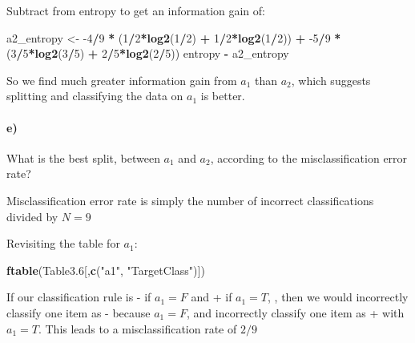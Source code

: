 \documentclass[]{article}
\newenvironment{Shaded}{\begin{snugshade}}{\end{snugshade}}
\newcommand{\DecValTok}[1]{\textcolor[rgb]{0.00,0.00,0.81}{#1}}
\newcommand{\FloatTok}[1]{\textcolor[rgb]{0.00,0.00,0.81}{#1}}
\newcommand{\KeywordTok}[1]{\textcolor[rgb]{0.13,0.29,0.53}{\textbf{#1}}}
\newcommand{\NormalTok}[1]{#1}
\newcommand{\OperatorTok}[1]{\textcolor[rgb]{0.81,0.36,0.00}{\textbf{#1}}}
\newcommand{\StringTok}[1]{\textcolor[rgb]{0.31,0.60,0.02}{#1}}
\let\oldparagraph\paragraph
\renewcommand{\paragraph}[1]{\oldparagraph{#1}\mbox{}}
\begin{document}
Subtract from entropy to get an information gain of:

\begin{Shaded}
\begin{Highlighting}[]
\NormalTok{a2_entropy <-}\StringTok{ }\DecValTok{-4}\OperatorTok{/}\DecValTok{9} \OperatorTok{*}\StringTok{ }\NormalTok{(}\DecValTok{1}\OperatorTok{/}\DecValTok{2}\OperatorTok{*}\KeywordTok{log2}\NormalTok{(}\DecValTok{1}\OperatorTok{/}\DecValTok{2}\NormalTok{) }\OperatorTok{+}\StringTok{ }\DecValTok{1}\OperatorTok{/}\DecValTok{2}\OperatorTok{*}\KeywordTok{log2}\NormalTok{(}\DecValTok{1}\OperatorTok{/}\DecValTok{2}\NormalTok{)) }\OperatorTok{+}\StringTok{ }\DecValTok{-5}\OperatorTok{/}\DecValTok{9} \OperatorTok{*}\StringTok{ }\NormalTok{(}\DecValTok{3}\OperatorTok{/}\DecValTok{5}\OperatorTok{*}\KeywordTok{log2}\NormalTok{(}\DecValTok{3}\OperatorTok{/}\DecValTok{5}\NormalTok{) }\OperatorTok{+}\StringTok{ }\DecValTok{2}\OperatorTok{/}\DecValTok{5}\OperatorTok{*}\KeywordTok{log2}\NormalTok{(}\DecValTok{2}\OperatorTok{/}\DecValTok{5}\NormalTok{))}
\NormalTok{entropy }\OperatorTok{-}\StringTok{ }\NormalTok{a2_entropy}
\end{Highlighting}
\end{Shaded}

So we find much greater information gain from \(a_1\) than \(a_2\),
which suggests splitting and classifying the data on \(a_1\) is better.

\hypertarget{e}{%
\paragraph{e)}\label{e}}

What is the best split, between \(a_1\) and \(a_2\), according to the
misclassification error rate?

Misclassification error rate is simply the number of incorrect
classifications divided by \(N = 9\)

Revisiting the table for \(a_1\):

\begin{Shaded}
\begin{Highlighting}[]
\KeywordTok{ftable}\NormalTok{(Table3}\FloatTok{.6}\NormalTok{[,}\KeywordTok{c}\NormalTok{(}\StringTok{"a1"}\NormalTok{, }\StringTok{"TargetClass"}\NormalTok{)])}
\end{Highlighting}
\end{Shaded}

If our classification rule is - if \(a_1 = F\) and + if \(a_1 = T\), ,
then we would incorrectly classify one item as - because \(a_1 = F\),
and incorrectly classify one item as + with \(a_1 = T\). This leads to a
misclassification rate of \(2/9\)
\end{document}

